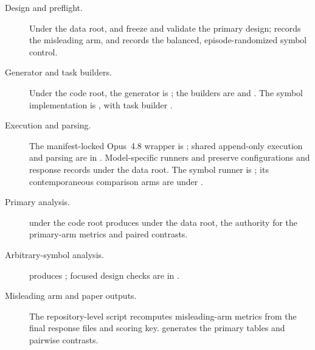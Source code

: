 \begin{description}
  \item[Design and preflight.]
  Under the data root,  and
   freeze and validate the primary design;
   records the misleading arm,
  and  records the balanced,
  episode-randomized symbol control.

  \item[Generator and task builders.]
  Under the code root, the generator is
  ; the builders are
   and
  . The symbol implementation is
  , with task builder
  .

  \item[Execution and parsing.]
  The manifest-locked Opus~4.8 wrapper is
  ; shared
  append-only execution and parsing are in
  . Model-specific runners and
   preserve configurations
  and response records under the data root. The symbol runner is
  ; its contemporaneous comparison arms
  are under .

  \item[Primary analysis.]
   under the
  code root produces  under the data root,
  the authority for the primary-arm metrics and paired contrasts.

  \item[Arbitrary-symbol analysis.]
   produces
  ; focused design checks are in
  .

  \item[Misleading arm and paper outputs.]
  The repository-level script
   recomputes misleading-arm
  metrics from the final response files and scoring key.
   generates the primary tables
  and pairwise contrasts.
\end{description}
\clearpage
